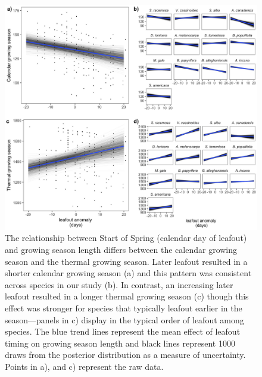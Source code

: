 \documentclass{article}[12pt]
\begin{document}
{%
\begin{figure}[h!]
    \centering
 \includegraphics[width=.8\textwidth]{..//analyses/figures/primarygrowingseason_modplots.jpeg} 
    \caption{The relationship between Start of Spring (calendar day of leafout) and growing season length differs between the calendar growing season and the thermal growing season. Later leafout resulted in a shorter calendar growing season (a) and this pattern was consistent across species in our study (b). In contrast, an increasing later leafout resulted in a longer thermal growing season (c) though this effect was stronger for species that typically leafout earlier in the season---panels in c) display in the typical order of leafout among species. The blue trend lines represent the mean effect of leafout timing on growing season length and black lines represent 1000 draws from the posterior distribution as a measure of uncertainty. Points in a), and c) represent the raw data.}
    \label{fig:thermcal}
\end{figure}

}
\end{document}
